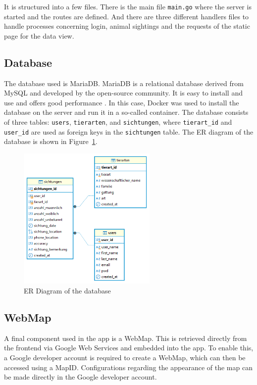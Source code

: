\documentclass{josis}
\begin{document}
It is structured into a few files. There is the main file \texttt{main.go} where the server is started and the routes are defined.
And there are three different handlers files to handle processes concerning login, animal sightings and the requests of the static
page for the data view.

\subsection{Database}

The database used is MariaDB. MariaDB is a relational database derived from MySQL and developed by the open-source community. 
It is easy to install and use and offers good performance \cite{MariaDBFoundation}.
In this case, Docker was used to install the database on the server and run it in a so-called container. 
The database consists of three tables: \texttt{users}, \texttt{tierarten}, and \texttt{sichtungen}, 
where \texttt{tierart\_id} and \texttt{user\_id} are used as foreign keys in the \texttt{sichtungen} table. 
The ER diagram of the database is shown in Figure~\ref{fig:db_structure}.

\begin{figure}[tbh]
    \centering
    \includegraphics[width=0.6\textwidth]{images/db_structure.png}
    \caption{ER Diagram of the database}\label{fig:db_structure}
\end{figure}

\subsection{WebMap}

A final component used in the app is a WebMap. This is retrieved directly from the frontend 
via Google Web Services and embedded into the app. To enable this, 
a Google developer account is required to create a WebMap, 
which can then be accessed using a MapID. Configurations regarding the appearance of the map can be made directly in the Google developer account.
\end{document}
